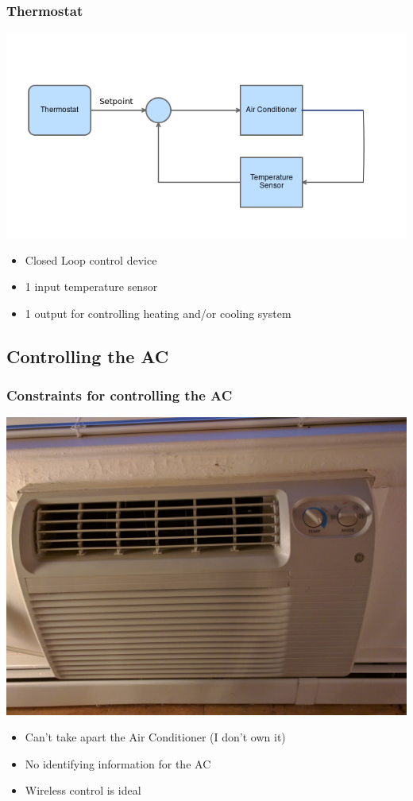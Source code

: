 \documentclass[aspectratio=169,11pt,hyperref={colorlinks=true}]{beamer}
\begin{document}
\begin{frame}
    \frametitle{Thermostat}
    \begin{center}
    \includegraphics[width=.8\textwidth]{flowchart.png}
    \end{center}
    \begin{itemize}
        \item Closed Loop control device
        \item 1 input temperature sensor
        \item 1 output for controlling heating and/or cooling system
    \end{itemize}
\end{frame}

\subsection{Controlling the AC}
\begin{frame}
    \frametitle{Constraints for controlling the AC}
    \begin{center}
        \includegraphics[width=.53\textwidth]{AC_unit.jpeg}
    \end{center}
    \begin{itemize}
        \item Can't take apart the Air Conditioner (I don't own it)
        \item No identifying information for the AC
        \item Wireless control is ideal
    \end{itemize}
\end{frame}
\end{document}
